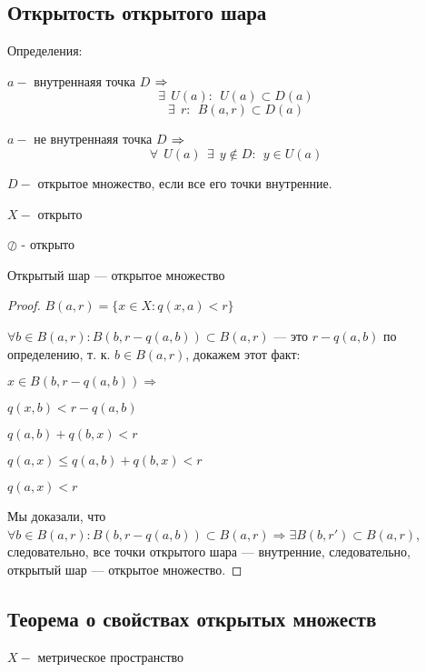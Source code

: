 \newpage
{}
\subsection{Открытость открытого шара}
    Определения:
    
        $a-$ внутреннаяя точка $D$
        $\Rightarrow\\$
        $$\exists \ \ U(a) : \ \ U(a) \subset D(a)$$
        $$\exists \ \ r : \ \ B(a, r) \subset D(a)$$
        
        $a-$ не внутреннаяя точка $D$
        $\Rightarrow\\$
        $$\forall \ \ U(a) \ \ \exists \ \ y \notin D : \ \  y \in U(a)$$
        
        $D-$ открытое множество, если все его точки внутренние.
        
        $X-$ открыто
        
        $\oslash$ - открыто
        \begin{theorem*}
            Открытый шар {---} открытое множество
        \end{theorem*}
        \begin{proof}
        $B(a,r) = \{x \in X : q(x, a) < r\}$
        
        $\forall b \in B(a,r) : B(b, r - q(a, b)) \subset B(a, r)$ {---} это $r - q(a, b)$ по определению, т. к. $b \in B(a,r)$, докажем этот факт:
        
        $x \in B(b, r - q(a, b)) \Rightarrow$
        
        $q(x, b) < r - q(a, b)$
        
        $q(a, b) + q(b, x) < r$
        
        $q(a, x) \leqslant q(a, b) + q(b, x) < r$
        
        $q(a, x) < r$
        
        Мы доказали, что $\forall b \in B(a,r) : B(b, r - q(a, b)) \subset B(a, r) \Rightarrow \exists B(b, r') \subset B(a, r)$, следовательно, все точки открытого шара --- внутренние, следовательно, открытый шар --- открытое множество.
        \end{proof}
\newpage
\subsection{Теорема о свойствах открытых множеств}
    $X-$ метрическое пространство
    
